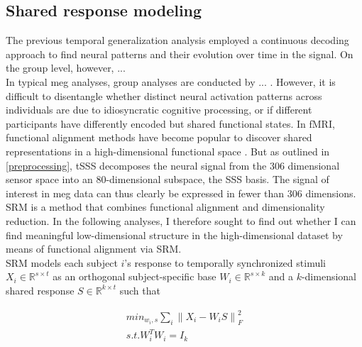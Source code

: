 \pagebreak

\subsection{Shared response modeling}
The previous temporal generalization analysis employed a continuous decoding approach to find neural patterns and their evolution over time in the signal.
On the group level, however, ... \\
In typical \gls{meg} analyses, group analyses are conducted by ... .
However, it is difficult to disentangle whether distinct neural activation patterns across individuals are due to idiosyncratic cognitive processing, or if different participants have differently encoded but shared functional states.
In \gls{fMRI}, functional alignment methods have become popular to discover shared representations in a high-dimensional functional space \citep{haxby2020hyperalignment}.
But as outlined in \ref{preprocessing}, \gls{tSSS} decomposes the neural signal from the 306 dimensional sensor space into an 80-dimensional subspace, the \gls{SSS} basis.
The signal of interest in \gls{meg} data can thus clearly be expressed in fewer than 306 dimensions.
\gls{SRM} \citep{NIPS2015_b3967a0e} is a method that combines functional alignment and dimensionality reduction.
In the following analyses, I therefore sought to find out whether I can find meaningful low-dimensional structure in the high-dimensional dataset by means of functional alignment via \gls{SRM}.\\
\gls{SRM} models each subject $i$'s response to temporally synchronized stimuli $X_i \in \mathbb{R}^{s \times t}$ as an orthogonal subject-specific base $W_i \in \mathbb{R}^{s\times k}$ and a $k$-dimensional shared response $S \in \mathbb{R}^{k \times t}$ such that


\begin{equation}
	\begin{aligned}
		min_{w_i, s}\sum_i{\|X_i - W_iS \|}^2_F \\
		s.t. W^T_iW_i = I_k
	\end{aligned}
	\label{eq:srm}
\end{equation}

